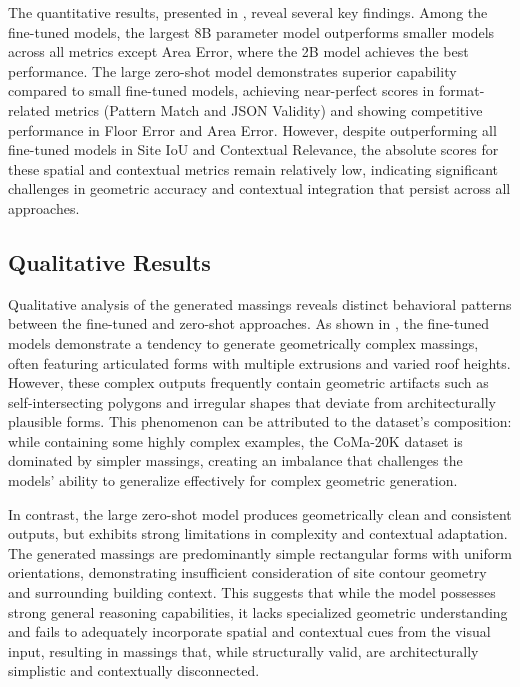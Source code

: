 The quantitative results, presented in , reveal several key findings. Among the fine-tuned models, the largest 8B parameter model outperforms smaller models across all metrics except Area Error, where the 2B model achieves the best performance. The large zero-shot model demonstrates superior capability compared to small fine-tuned models, achieving near-perfect scores in format-related metrics (Pattern Match and JSON Validity) and showing competitive performance in Floor Error and Area Error. However, despite outperforming all fine-tuned models in Site IoU and Contextual Relevance, the absolute scores for these spatial and contextual metrics remain relatively low, indicating significant challenges in geometric accuracy and contextual integration that persist across all approaches.

\subsection{Qualitative Results}

Qualitative analysis of the generated massings reveals distinct behavioral patterns between the fine-tuned and zero-shot approaches. As shown in , the fine-tuned models demonstrate a tendency to generate geometrically complex massings, often featuring articulated forms with multiple extrusions and varied roof heights. However, these complex outputs frequently contain geometric artifacts such as self-intersecting polygons and irregular shapes that deviate from architecturally plausible forms. This phenomenon can be attributed to the dataset's composition: while containing some highly complex examples, the CoMa-20K dataset is dominated by simpler massings, creating an imbalance that challenges the models' ability to generalize effectively for complex geometric generation.

In contrast, the large zero-shot model produces geometrically clean and consistent outputs, but exhibits strong limitations in complexity and contextual adaptation. The generated massings are predominantly simple rectangular forms with uniform orientations, demonstrating insufficient consideration of site contour geometry and surrounding building context. This suggests that while the model possesses strong general reasoning capabilities, it lacks specialized geometric understanding and fails to adequately incorporate spatial and contextual cues from the visual input, resulting in massings that, while structurally valid, are architecturally simplistic and contextually disconnected.


